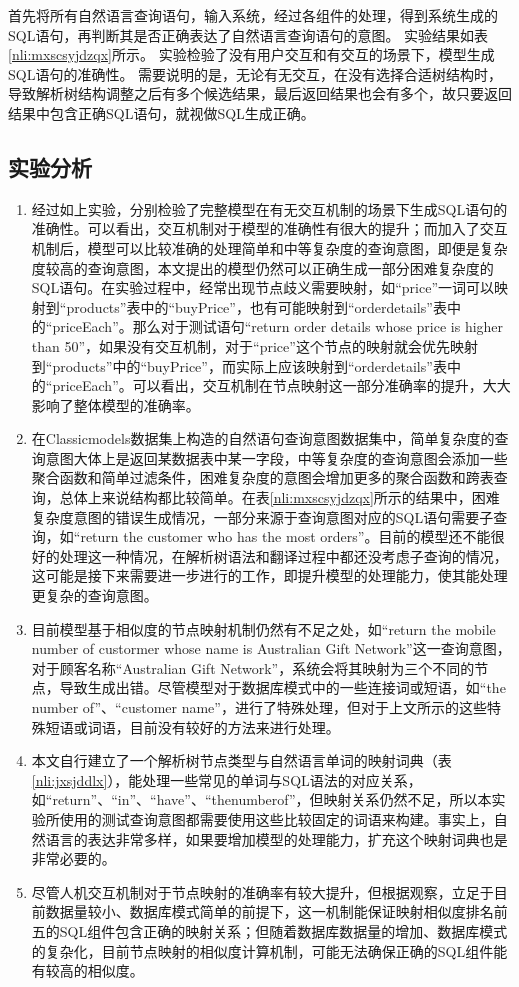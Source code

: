 首先将所有自然语言查询语句，输入系统，经过各组件的处理，得到系统生成的SQL语句，再判断其是否正确表达了自然语言查询语句的意图。
实验结果如表\ref{nli:mxscsyjdzqx}所示。
实验检验了没有用户交互和有交互的场景下，模型生成SQL语句的准确性。
需要说明的是，无论有无交互，在没有选择合适树结构时，导致解析树结构调整之后有多个候选结果，最后返回结果也会有多个，故只要返回结果中包含正确SQL语句，就视做SQL生成正确。




\subsection{实验分析}
\begin{enumerate}
    \item 经过如上实验，分别检验了完整模型在有无交互机制的场景下生成SQL语句的准确性。可以看出，交互机制对于模型的准确性有很大的提升；而加入了交互机制后，模型可以比较准确的处理简单和中等复杂度的查询意图，即便是复杂度较高的查询意图，本文提出的模型仍然可以正确生成一部分困难复杂度的SQL语句。在实验过程中，经常出现节点歧义需要映射，如“price”一词可以映射到“products”表中的“buyPrice”，也有可能映射到“orderdetails”表中的“priceEach”。那么对于测试语句“return order details whose price is higher than 50”，如果没有交互机制，对于“price”这个节点的映射就会优先映射到“products”中的“buyPrice”，而实际上应该映射到“orderdetails”表中的“priceEach”。可以看出，交互机制在节点映射这一部分准确率的提升，大大影响了整体模型的准确率。
    \item	在Classicmodels数据集上构造的自然语句查询意图数据集中，简单复杂度的查询意图大体上是返回某数据表中某一字段，中等复杂度的查询意图会添加一些聚合函数和简单过滤条件，困难复杂度的意图会增加更多的聚合函数和跨表查询，总体上来说结构都比较简单。在表\ref{nli:mxscsyjdzqx}所示的结果中，困难复杂度意图的错误生成情况，一部分来源于查询意图对应的SQL语句需要子查询，如“return the customer who has the most orders”。目前的模型还不能很好的处理这一种情况，在解析树语法和翻译过程中都还没考虑子查询的情况，这可能是接下来需要进一步进行的工作，即提升模型的处理能力，使其能处理更复杂的查询意图。
    \item	目前模型基于相似度的节点映射机制仍然有不足之处，如“return the mobile number of custormer whose name is Australian Gift Network”这一查询意图，对于顾客名称“Australian Gift Network”，系统会将其映射为三个不同的节点，导致生成出错。尽管模型对于数据库模式中的一些连接词或短语，如“the number of”、“customer name”，进行了特殊处理，但对于上文所示的这些特殊短语或词语，目前没有较好的方法来进行处理。
    \item	本文自行建立了一个解析树节点类型与自然语言单词的映射词典（表\ref{nli:jxsjddlx}），能处理一些常见的单词与SQL语法的对应关系，如“return”、“in”、“have”、“thenumberof”，但映射关系仍然不足，所以本实验所使用的测试查询意图都需要使用这些比较固定的词语来构建。事实上，自然语言的表达非常多样，如果要增加模型的处理能力，扩充这个映射词典也是非常必要的。
    \item	尽管人机交互机制对于节点映射的准确率有较大提升，但根据观察，立足于目前数据量较小、数据库模式简单的前提下，这一机制能保证映射相似度排名前五的SQL组件包含正确的映射关系；但随着数据库数据量的增加、数据库模式的复杂化，目前节点映射的相似度计算机制，可能无法确保正确的SQL组件能有较高的相似度。
\end{enumerate}


